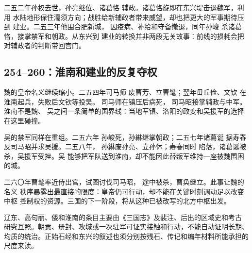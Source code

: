 二五二年孙权去世，孙亮继位、诸葛恪
辅政。诸葛恪旋即在东兴堤击退魏军，利用
水陆地形保住濡须方向；战胜给新辅政者带来威望，却也把更大的军事期待压到
建业。二五三年他围合肥新城，
因疫病、补给和守备撤退，同年孙峻
杀诸葛恪，接掌禁军和朝政。从东兴到
建业的转换并非两段无关故事：前线的损耗会把对辅政者的判断带回宫门。

\subsection{254--260：淮南和建业的反复夺权}

魏的皇帝名义继续缩小。二五四年司马师
废曹芳、立曹髦；翌年毌丘俭、文钦
在淮南起兵，失败后文钦等投吴。
司马师在镇压后病死，
司马昭接掌辅政与中军。淮南不是魏、
吴之间一条简单的国界线：当地军镇、洛阳的政变和吴援军的选择在这里碰撞。

吴的禁军同样在重组。二五六年
孙峻死，孙綝继掌朝政；二五七年诸葛诞
据寿春反司马昭并求吴援。二五八年，
孙綝废孙亮、立孙休；寿春同时
陷落，诸葛诞被杀，吴援军受挫。吴
能够把军队送到淮南，却不能因此替叛军维持一座被魏围困的城。

二六〇年曹髦率近侍出宫，试图讨伐司马昭，
途中被杀，曹奂继立。此事让魏的名义
秩序暴露出最直接的限度：皇帝仍可行动，却不能在关键时刻调动足以改变中枢
控制权的资源。三国的下一阶段，将从这种已被改写的北方中枢出发。

\begin{sourcenote}[同时代的边界不是现代国界]
辽东、高句丽、倭和淮南的条目主要由《三国志》及裴注、后出的区域史和考古
研究互照。朝贡、册封、攻城或一次驻军可证实接触和行动，不能自动证明长期、
均质的统治。正始石经和东兴的叙述也须分别按残石、传记和编年材料所能承担的
尺度来读。
\end{sourcenote}
